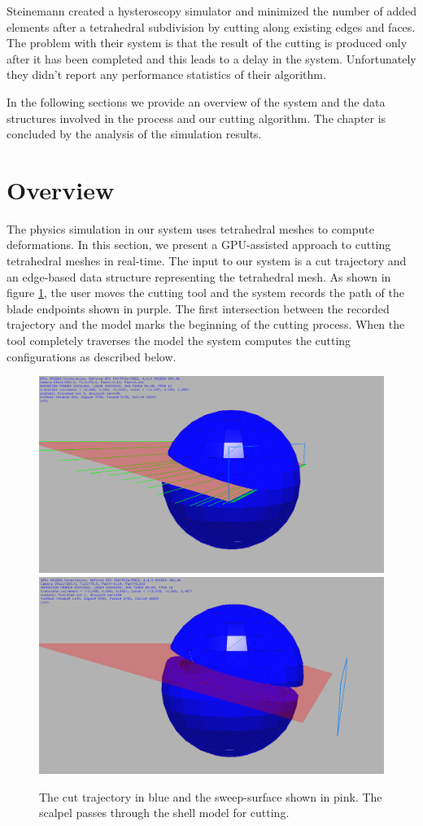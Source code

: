 Steinemann \etal \cite{Steinemann} created a hysteroscopy simulator and minimized the number of added elements 
after a tetrahedral subdivision by cutting along existing edges and faces. The problem with their system is that
the result of the cutting is produced only after it has been completed and this leads to a delay in the system. 
Unfortunately they didn't report any performance statistics of their algorithm. 

In the following sections we provide an overview of the system and the data structures involved in the process 
and our cutting algorithm. The chapter is concluded by the analysis of the simulation results.

\section{Overview}
The physics simulation in our system uses tetrahedral meshes to compute deformations. In this section,
we present a GPU-assisted approach to cutting tetrahedral meshes in real-time. 
The input to our system is a cut trajectory and an edge-based data structure representing the tetrahedral mesh. 
As shown in figure \ref{fig:sweepsurf}, the user moves the cutting tool and the system records the path of the 
blade endpoints shown in purple. The first intersection between the recorded trajectory and the model marks the 
beginning of the cutting process. When the tool completely traverses the model the system computes the cutting
configurations as described below. 

\begin{figure}[H]
  \centering
  \includegraphics[width=0.6\linewidth]{figures/cutting/trajectory03.png}
  \includegraphics[width=0.6\linewidth]{figures/cutting/trajectory04.png}
  \caption{\label{fig:sweepsurf}
  {The cut trajectory in blue and the sweep-surface shown in pink. The scalpel passes through the shell model for cutting.}
}
\end{figure}

